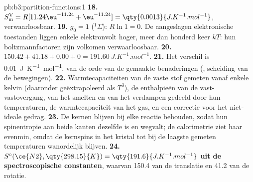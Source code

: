 \begin{solution}{pb:b3:partition-functions:1}
\textbf{18.} $S^{\mathrm V}_{\mathrm m} = R[11.24\eu^{-11.24} + \eu^{-11.24}] = \qty{0.0013}{J.K^{-1}.mol^{-1}}$, verwaarloosbaar.
\textbf{19.} $g_0 = 1$ (${}^1\Sigma$): $R\ln1 = 0$. De aangeslagen
elektronische toestanden liggen enkele elektronvolt hoger, meer dan
honderd keer $kT$: hun boltzmannfactoren zijn volkomen verwaarloosbaar.
\textbf{20.} $150.42 + 41.18 + 0.00 + 0 = \qty{191.60}{J.K^{-1}.mol^{-1}}$.
\textbf{21.} Het verschil is \qty{0.01}{J.K^{-1}.mol^{-1}}, van de orde van
de gemaakte benaderingen (, scheiding van de bewegingen).
\textbf{22.} Warmtecapaciteiten van de vaste stof gemeten vanaf enkele
kelvin (daaronder geëxtrapoleerd als $T^3$), de enthalpieën van de
vast-vastovergang, van het smelten en van het verdampen gedeeld door hun
temperaturen, de warmtecapaciteit van het gas, en een correctie voor het
niet-ideale gedrag.
\textbf{23.} De kernen blijven bij elke reactie behouden, zodat hun
spinentropie aan beide kanten dezelfde is en wegvalt; de calorimetrie ziet
haar evenmin, omdat de kernspins in het kristal tot bij de laagste gemeten
temperaturen wanordelijk blijven.
\textbf{24.} \textbf{$S^\circ(\ce{N2}, \qty{298.15}{K}) = \qty{191.6}{J.K^{-1}.mol^{-1}}$ uit de
spectroscopische constanten}, waarvan 150.4 van de translatie en 41.2 van
de rotatie.
\end{solution}
